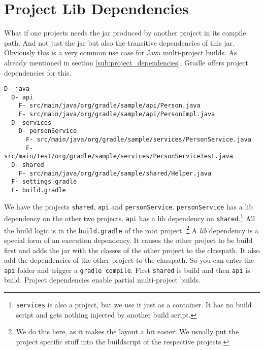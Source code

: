 \section{Project Lib Dependencies} %
\label{sec:project_jar_dependencies}
What if one projects needs the jar produced by another project in its compile path. And not just the jar but also the transitive dependencies of this jar. Obviously this is a very common use case for Java multi-project builds. As already mentioned in section \ref{sub:project_dependencies}, Gradle offers project dependencies for this.
\begin{Verbatim}[frame=single,label=Project Tree]
D- java
  D- api
    F- src/main/java/org/gradle/sample/api/Person.java
    F- src/main/java/org/gradle/sample/api/PersonImpl.java
  D- services
    D- personService
      F- src/main/java/org/gradle/sample/services/PersonService.java
      F- src/main/test/org/gradle/sample/services/PersonServiceTest.java
  D- shared 
    F- src/main/java/org/gradle/sample/shared/Helper.java 
  F- settings.gradle
  F- build.gradle
\end{Verbatim}
We have the projects \texttt{shared}, \texttt{api} and \texttt{personService}. \texttt{personService} has a lib dependency on the other two projects. \texttt{api} has a lib dependency on \texttt{shared}.\footnote{\texttt{services} is also a project, but we use it just as a container. It has no build script and gets nothing injected by another build script.}
All the build logic is in the \texttt{build.gradle} of the root project.
\footnote{We do this here, as it makes the layout a bit easier. We usually put the project specific stuff into the buildscript of the respective projects.} 
A \emph{lib} dependency is a special form of an execution dependency. It causes the other project to be build first and adds the jar with the classes of the other project to the classpath. It also add the dependencies of the other project to the classpath. So you can enter the \texttt{api} folder and trigger a \texttt{gradle compile}. First \texttt{shared} is build and then \texttt{api} is build. Project dependencies enable partial multi-project builds.

